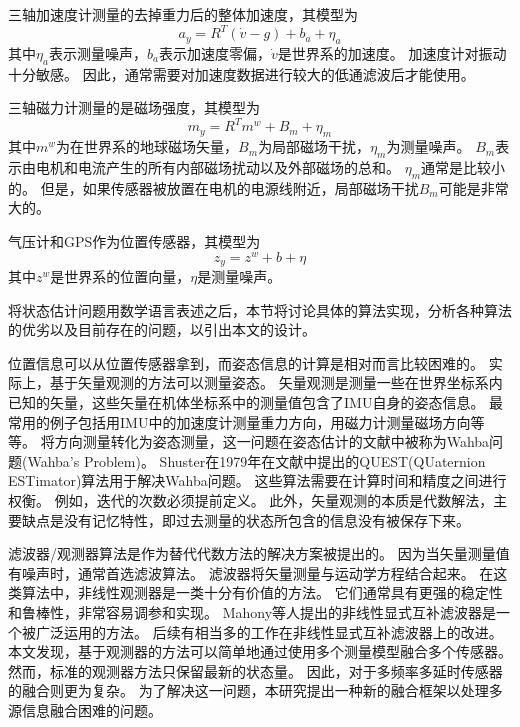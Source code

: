 \documentclass[
  type=master
]{gdutthesis}
\begin{document}
三轴加速度计测量的去掉重力后的整体加速度，其模型为
\begin{equation}\label{eq:accmodel}
	a_y=R^T(\dot{v}-g)+b_a+\eta_a
\end{equation}
其中$\eta_a$表示测量噪声，$b_a$表示加速度零偏，$\dot{v}$是世界系的加速度。
加速度计对振动十分敏感。
因此，通常需要对加速度数据进行较大的低通滤波后才能使用。

三轴磁力计测量的是磁场强度，其模型为
\begin{equation}\label{eq:magmodel}
	m_y=R^T m^w+B_m+\eta_m
\end{equation}
其中$m^w$为在世界系的地球磁场矢量，$B_m$为局部磁场干扰，$\eta_m$为测量噪声。
$B_m$表示由电机和电流产生的所有内部磁场扰动以及外部磁场的总和。
$\eta_m$通常是比较小的。
但是，如果传感器被放置在电机的电源线附近，局部磁场干扰$B_m$可能是非常大的。

气压计和GPS作为位置传感器，其模型为
\begin{equation}\label{eq:magmodel}
	z_y=z^w+b+\eta
\end{equation}
其中$z^w$是世界系的位置向量，$\eta$是测量噪声。

将状态估计问题用数学语言表述之后，本节将讨论具体的算法实现，分析各种算法的优劣以及目前存在的问题，以引出本文的设计。

位置信息可以从位置传感器拿到，而姿态信息的计算是相对而言比较困难的。
实际上，基于矢量观测的方法可以测量姿态。
矢量观测是测量一些在世界坐标系内已知的矢量，这些矢量在机体坐标系中的测量值包含了IMU自身的姿态信息。
最常用的例子包括用IMU中的加速度计测量重力方向，用磁力计测量磁场方向等等。
将方向测量转化为姿态测量，这一问题在姿态估计的文献中被称为Wahba问题(Wahba's Problem)\cite{wahba1965least}。
Shuster在1979年在文献\parencite{shuster1981three}中提出的QUEST(QUaternion ESTimator)算法用于解决Wahba问题。
这些算法需要在计算时间和精度之间进行权衡。
例如，迭代的次数必须提前定义。
此外，矢量观测的本质是代数解法，主要缺点是没有记忆特性，即过去测量的状态所包含的信息没有被保存下来。

滤波器/观测器算法是作为替代代数方法的解决方案被提出的。
因为当矢量测量值有噪声时，通常首选滤波算法。
滤波器将矢量测量与运动学方程结合起来。
在这类算法中，非线性观测器是一类十分有价值的方法。
它们通常具有更强的稳定性和鲁棒性，非常容易调参和实现。
Mahony等人提出的非线性显式互补滤波器是一个被广泛运用的方法\cite{mahony2008nonlinear}。
后续有相当多的工作在非线性显式互补滤波器上的改进\cite{hua2010attitude,khosravian2016state}。
本文发现，基于观测器的方法可以简单地通过使用多个测量模型融合多个传感器。
然而，标准的观测器方法只保留最新的状态量。
因此，对于多频率多延时传感器的融合则更为复杂。
为了解决这一问题，本研究提出一种新的融合框架以处理多源信息融合困难的问题。
\end{document}
